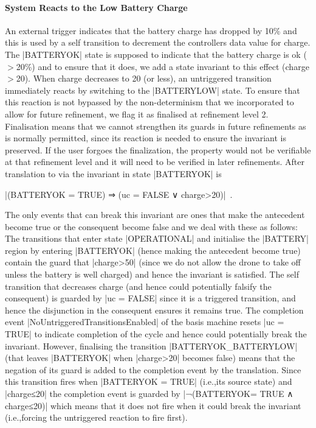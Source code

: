 \paragraph{System Reacts to the Low Battery Charge}
An external trigger indicates that the battery charge has dropped by 10\% and this is used by a self transition to decrement the controllers data value for charge.
The |BATTERYOK| state is supposed to indicate that the battery charge is ok ($>$20\%) and to ensure that it does, we add a state invariant to this effect (charge$>$20).
When charge decreases to 20 (or less), an untriggered transition immediately reacts by switching to the |BATTERYLOW| state.
To ensure that this reaction is not bypassed by the non-determinism that we incorporated to allow for future refinement, we flag it as finalised at refinement level 2.
Finalisation means that we cannot strengthen its guards in future refinements as is normally permitted, since its reaction is needed to ensure the invariant is preserved. If the user forgoes the finalization, the property would not be verifiable at that refinement level and it will need to be verified in later refinements.
After translation to 
\EVENTB via \UMLB
the invariant in state |BATTERYOK| is 
\begin{center}
 |(BATTERYOK = TRUE) ⇒ (uc = FALSE ∨ charge>20)|~.
\end{center}
The only events that can break this invariant are ones that make the antecedent become true or the consequent become false and we deal with these as follows:
The transitions that enter state |OPERATIONAL| and initialise the |BATTERY| region by entering |BATTERYOK| (hence making the antecedent become true) contain the guard that |charge>50| (since we do not allow the drone to take off unless the battery is well charged) and hence the invariant is satisfied.
The self transition that decreases charge (and hence could potentially falsify the consequent) is guarded by |uc = FALSE| since it is a triggered transition, and hence the disjunction in the consequent ensures it remains true.
The completion event |NoUntriggeredTransitionsEnabled| of the basis machine resets |uc = TRUE| to indicate completion of the cycle and hence could potentially break the invariant. 
However, finalising the transition |BATTERYOK_BATTERYLOW| (that leaves |BATTERYOK| when |charge>20| becomes false) means that  the negation of its guard is added to the completion event by the translation.
Since this transition fires when |BATTERYOK = TRUE| (i.e.,its source state) and |charge≤20| the completion event is guarded by |¬(BATTERYOK= TRUE ∧ charge≤20)| which means that it does not fire when it could break the invariant (i.e.,forcing the untriggered reaction to fire first).

